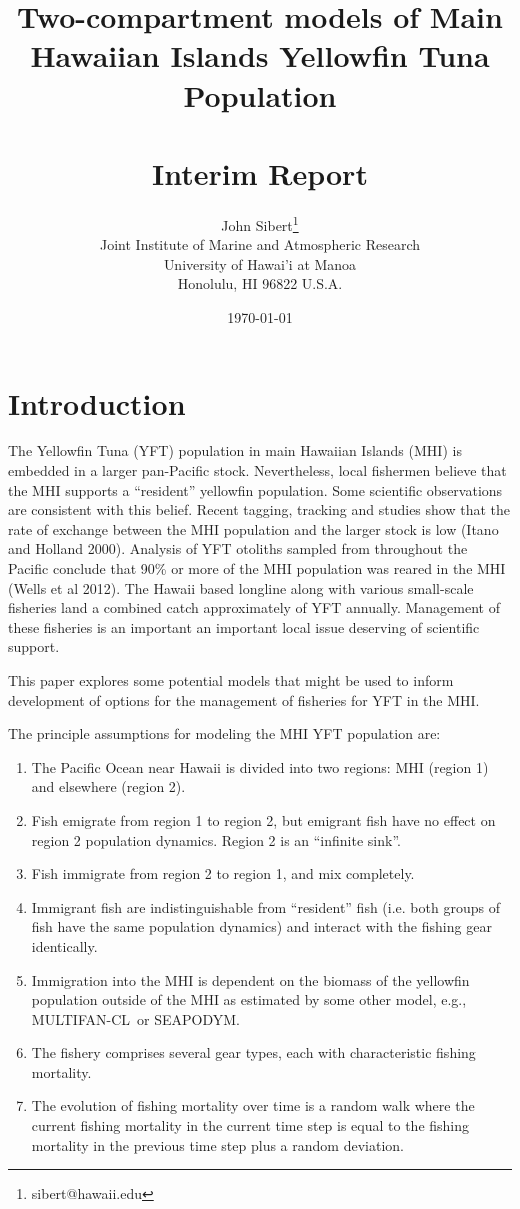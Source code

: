 \documentclass[12pt,letterpaper]{article}
\title{Two-compartment models of Main Hawaiian Islands Yellowfin Tuna
Population\\
~\\
Interim Report}
\author{
John Sibert\thanks{sibert@hawaii.edu}\\
Joint Institute of Marine and Atmospheric Research\\
University of Hawai'i at Manoa\\
Honolulu, HI  96822 U.S.A.\\[0.125in]
\date{\today}
}
\newcommand\doublespacing{\baselineskip=1.6\normalbaselineskip}
\newcommand\SD{SEAPODYM}
\newcommand\MFCL{MULTIFAN-CL}
\newcommand\help[1]{\color{Magenta}{\it #1 }\normalcolor}
\begin{document}
\maketitle

\doublespacing

\section*{Introduction}
The Yellowfin Tuna (YFT) population in main Hawaiian Islands (MHI) is
embedded in a larger pan-Pacific stock. Nevertheless, local fishermen
believe that the MHI supports a ``resident'' yellowfin population.
Some scientific observations are consistent with this belief. 
Recent tagging, tracking and
studies show that the rate of exchange between the MHI population
and the larger stock is low (Itano and Holland 2000). Analysis
of YFT otoliths sampled from
throughout the Pacific conclude that 90\% or more of the MHI
population was reared in the MHI (Wells et al 2012).
The Hawaii based longline along with various small-scale fisheries
land a combined catch
approximately \help{???? mt} of YFT annually. Management of these
fisheries is an important an important  local issue deserving of scientific support.

This paper explores some potential models that might be used to
inform development of options for the management of fisheries for YFT
in the MHI.

The principle assumptions for modeling the MHI YFT population are:
\begin{enumerate}
\item The Pacific Ocean near Hawaii is divided into two regions:
MHI (region 1) and elsewhere (region 2).%
\item Fish emigrate from region 1 to region 2, but emigrant fish have
no effect on region 2 population dynamics. Region 2 is an ``infinite
sink''.
\item Fish immigrate from region 2 to region 1, and mix completely.
\item Immigrant fish are indistinguishable from ``resident'' fish
(i.e. both groups of fish have the same population dynamics) and
interact with the fishing gear identically.
\item Immigration into the MHI is dependent on the
biomass of the yellowfin population outside of the MHI as estimated by
some other model, e.g., \MFCL\ or \SD.
\item The fishery comprises several gear types, each with characteristic
fishing mortality.
\item The evolution of fishing mortality over time is a random walk
where the current fishing mortality in the current time step is equal
to the fishing mortality in the previous time step plus a random
deviation.
\end{enumerate}
\end{document}

